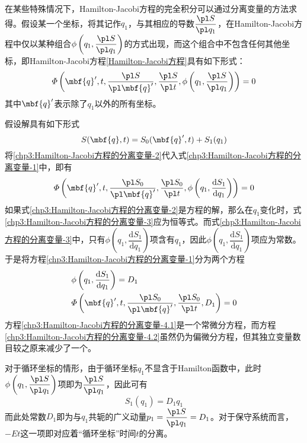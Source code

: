 在某些特殊情况下，Hamilton-Jacobi方程的完全积分可以通过分离变量的方法求得。假设某一个坐标，将其记作$q_1$，与其相应的导数$\dfrac{\pl S}{\pl q_1}$，在Hamilton-Jacobi方程中仅以某种组合$\phi\left(q_1,\dfrac{\pl S}{\pl q_1}\right)$的方式出现，而这个组合中不包含任何其他坐标，即Hamilton-Jacobi方程\eqref{Hamilton-Jacobi方程}具有如下形式：
\begin{equation}
	\varPhi\left(\mbf{q}',t,\frac{\pl S}{\pl \mbf{q}'},\frac{\pl S}{\pl t},\phi\left(q_1,\dfrac{\pl S}{\pl q_1}\right)\right) = 0
	\label{chp3:Hamilton-Jacobi方程的分离变量-1}
\end{equation}
其中$\mbf{q}'$表示除了$q_1$以外的所有坐标。

假设解具有如下形式
\begin{equation}
	S(\mbf{q},t) = S_0(\mbf{q}',t)+S_1(q_1)
	\label{chp3:Hamilton-Jacobi方程的分离变量-2}
\end{equation}
将\eqref{chp3:Hamilton-Jacobi方程的分离变量-2}代入式\eqref{chp3:Hamilton-Jacobi方程的分离变量-1}中，即有
\begin{equation}
	\varPhi\left(\mbf{q}',t,\frac{\pl S_0}{\pl \mbf{q}'},\frac{\pl S_0}{\pl t},\phi\left(q_1,\dfrac{\mathrm{d} S_1}{\mathrm{d} q_1}\right)\right) = 0
	\label{chp3:Hamilton-Jacobi方程的分离变量-3}
\end{equation}
如果式\eqref{chp3:Hamilton-Jacobi方程的分离变量-2}是方程的解，那么在$q_1$变化时，式\eqref{chp3:Hamilton-Jacobi方程的分离变量-3}应为恒等式。而式\eqref{chp3:Hamilton-Jacobi方程的分离变量-3}中，只有$\phi\left(q_1,\dfrac{\mathrm{d} S_1}{\mathrm{d} q_1}\right)$项含有$q_1$，因此$\phi\left(q_1,\dfrac{\mathrm{d} S_1}{\mathrm{d} q_1}\right)$项应为常数。于是将方程\eqref{chp3:Hamilton-Jacobi方程的分离变量-1}分为两个方程
\begin{align}
	& \phi\left(q_1,\dfrac{\mathrm{d} S_1}{\mathrm{d} q_1}\right) = D_1 \label{chp3:Hamilton-Jacobi方程的分离变量-4.1} \\
	& \varPhi\left(\mbf{q}',t,\frac{\pl S_0}{\pl \mbf{q}'},\frac{\pl S_0}{\pl t},D_1\right) = 0 \label{chp3:Hamilton-Jacobi方程的分离变量-4.2}
\end{align}
方程\eqref{chp3:Hamilton-Jacobi方程的分离变量-4.1}是一个常微分方程，而方程\eqref{chp3:Hamilton-Jacobi方程的分离变量-4.2}虽然仍为偏微分方程，但其独立变量数目较之原来减少了一个。

对于循环坐标的情形，由于循环坐标$q_1$不显含于Hamilton函数中，此时$\phi\left(q_1,\dfrac{\pl S}{\pl q_1}\right)$项即为$\dfrac{\pl S}{\pl q_1}$，因此可有
\begin{equation*}
	S_1(q_1) = D_1q_1
\end{equation*}
而此处常数$D_1$即为与$q_1$共轭的广义动量$p_1=\dfrac{\pl S}{\pl q_1}=D_1$。对于保守系统而言，$-Et$这一项即对应着“循环坐标”时间$t$的分离。

